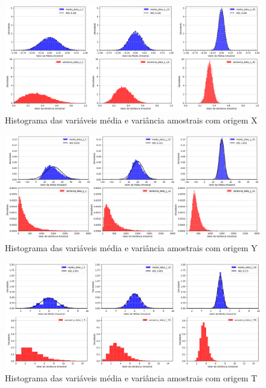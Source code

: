 \documentclass[a4paper, 11pt]{article}
\begin{document}
\begin{figure}[H]
    \centering 
    \includegraphics[width=1\textwidth]{imgs/medvarX.png}
    \caption{Histograma das variáveis média e variância amostrais com origem X}
    \label{fig:medvarX} %
\end{figure}

\begin{figure}[H]
    \centering 
    \includegraphics[width=1\textwidth]{imgs/medvarY.png}
    \caption{Histograma das variáveis média e variância amostrais  com origem Y}
    \label{fig:medvarY} %
\end{figure}

\begin{figure}[H]
    \centering 
    \includegraphics[width=1\textwidth]{imgs/medvarT.png}
    \caption{Histograma das variáveis média e variância amostrais com origem T}
    \label{fig:medvarT} %
\end{figure}
\end{document}
